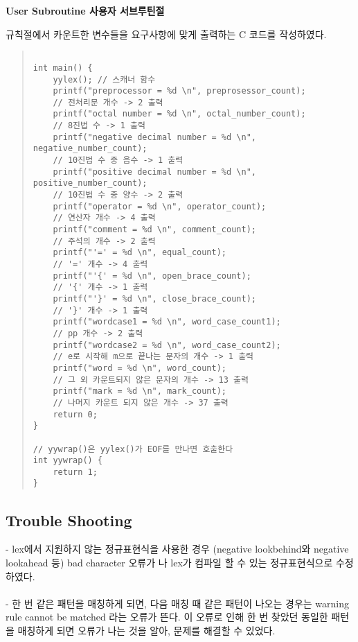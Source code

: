 \documentclass{article}
\begin{document}
\noindent
\begin{normalsize}
\textbf{User Subroutine 사용자 서브루틴절} \\
\end{normalsize}
규칙절에서 카운트한 변수들을 요구사항에 맞게 출력하는 C 코드를 작성하였다.  \\
\begin{quote}
\begin{verbatim}

int main() {
    yylex(); // 스캐너 함수 
    printf("preprocessor = %d \n", preprosessor_count); 
    // 전처리문 개수 -> 2 출력
    printf("octal number = %d \n", octal_number_count); 
    // 8진법 수 -> 1 출력
    printf("negative decimal number = %d \n", negative_number_count); 
    // 10진법 수 중 음수 -> 1 출력
    printf("positive decimal number = %d \n", positive_number_count); 
    // 10진법 수 중 양수 -> 2 출력
    printf("operator = %d \n", operator_count); 
    // 연산자 개수 -> 4 출력
    printf("comment = %d \n", comment_count); 
    // 주석의 개수 -> 2 출력
    printf("'=' = %d \n", equal_count); 
    // '=' 개수 -> 4 출력
    printf("'{' = %d \n", open_brace_count); 
    // '{' 개수 -> 1 출력
    printf("'}' = %d \n", close_brace_count); 
    // '}' 개수 -> 1 출력
    printf("wordcase1 = %d \n", word_case_count1); 
    // pp 개수 -> 2 출력
    printf("wordcase2 = %d \n", word_case_count2); 
    // e로 시작해 m으로 끝나는 문자의 개수 -> 1 출력
    printf("word = %d \n", word_count); 
    // 그 외 카운트되지 않은 문자의 개수 -> 13 출력
    printf("mark = %d \n", mark_count); 
    // 나머지 카운트 되지 않은 개수 -> 37 출력 
    return 0;
}

// yywrap()은 yylex()가 EOF를 만나면 호출한다 
int yywrap() {
    return 1;
}

\end{verbatim}
\end{quote}

\subsection{Trouble Shooting}
- lex에서 지원하지 않는 정규표현식을 사용한 경우 (negative lookbehind와 negative lookahead 등) bad character 오류가 나 lex가 컴파일 할 수 있는 정규표현식으로 수정하였다. \\ \\
\noindent
- 한 번 같은 패턴을 매칭하게 되면, 다음 매칭 때 같은 패턴이 나오는 경우는 warning rule cannot be matched 라는 오류가 뜬다. 이 오류로 인해 한 번 찾았던 동일한 패턴을 매칭하게 되면 오류가 나는 것을 알아, 문제를 해결할 수 있었다. \\
\end{document}
